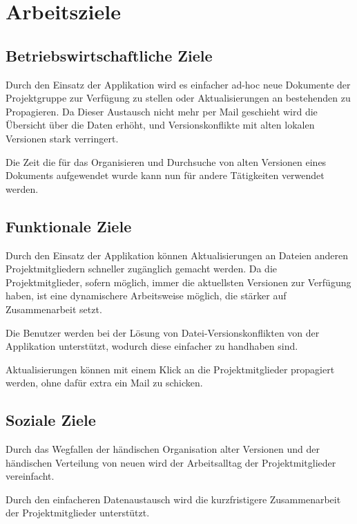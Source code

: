 
\section{Arbeitsziele}

\subsection{Betriebswirtschaftliche Ziele}

Durch den Einsatz der Applikation wird es einfacher ad-hoc neue Dokumente der Projektgruppe zur Verfügung zu stellen oder Aktualisierungen an bestehenden zu Propagieren. Da Dieser Austausch nicht mehr per Mail geschieht wird die Übersicht über die Daten erhöht, und Versionskonflikte mit alten lokalen Versionen stark verringert.

Die Zeit die für das Organisieren und Durchsuche von alten Versionen eines Dokuments aufgewendet wurde kann nun für andere Tätigkeiten verwendet werden.

\subsection{Funktionale Ziele}

Durch den Einsatz der Applikation können Aktualisierungen an Dateien anderen Projektmitgliedern schneller zugänglich gemacht werden. Da die Projektmitglieder, sofern möglich, immer die aktuellsten Versionen zur Verfügung haben, ist eine dynamischere Arbeitsweise möglich, die stärker auf Zusammenarbeit setzt.

Die Benutzer werden bei der Lösung von Datei-Versionskonflikten von der Applikation unterstützt, wodurch diese einfacher zu handhaben sind.

Aktualisierungen können mit einem Klick an die Projektmitglieder propagiert werden, ohne dafür extra ein Mail zu schicken.

\subsection{Soziale Ziele}
Durch das Wegfallen der händischen Organisation alter Versionen und der händischen Verteilung von neuen wird der Arbeitsalltag der Projektmitglieder vereinfacht.

Durch den einfacheren Datenaustausch wird die kurzfristigere Zusammenarbeit der Projektmitglieder unterstützt.

